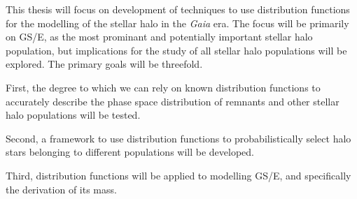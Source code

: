 This thesis will focus on development of techniques to use distribution functions for the modelling of the stellar halo in the \textit{Gaia} era. The focus will be primarily on GS/E, as the most prominant and potentially important stellar halo population, but implications for the study of all stellar halo populations will be explored. The primary goals will be threefold. 

First, the degree to which we can rely on known distribution functions to accurately describe the phase space distribution of remnants and other stellar halo populations will be tested. 

Second, a framework to use distribution functions to probabilistically select halo stars belonging to different populations will be developed.

Third, distribution functions will be applied to modelling GS/E, and specifically the derivation of its mass.